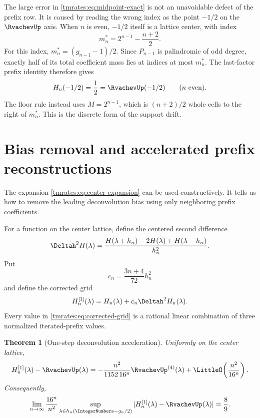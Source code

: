 \documentclass[11pt,oneside]{article}
\newtheorem{theorem}{Theorem}[section]
\theoremstyle{definition}
\theoremstyle{remark}
\begin{document}
The large error in \eqref{tmrates:eq:midpoint-exact} is not an unavoidable defect of the prefix row.
It is caused by reading the wrong index as the point $-1/2$ on the $\RvachevUp$ axis.  When $n$ is
even, $-1/2$ itself is a lattice center, with index
\begin{equation}
 m_n^*=2^{n-1}-\frac{n+2}{2}.                              \label{tmrates:eq:midpoint-correct-index}
\end{equation}
For this index, $m_n^*=(g_{n-1}-1)/2$.  Since $P_{n-1}$ is palindromic of odd degree, exactly
half of its total coefficient mass lies at indices at most $m_n^*$.  The last-factor prefix
identity therefore gives
\begin{equation}
 H_n(-1/2)=\frac12=\RvachevUp(-1/2) \qquad(n\ \text{even}).       \label{tmrates:eq:midpoint-centered-exact}
\end{equation}
The floor rule instead uses $M=2^{n-1}$, which is $(n+2)/2$ whole cells to the right of
$m_n^*$.  This is the discrete form of the support drift.

\section{Bias removal and accelerated prefix reconstructions}
\label{tmrates:sec:acceleration}

The expansion \eqref{tmrates:eq:center-expansion} can be used constructively.  It tells us how to
remove the leading deconvolution bias using only neighboring prefix coefficients.

For a function on the center lattice, define the centered second difference
\begin{equation}
 \Deltah^2H(\lambda)
 =\frac{H(\lambda+h_n)-2H(\lambda)+H(\lambda-h_n)}{h_n^2}. \label{tmrates:eq:discrete-laplacian}
\end{equation}
Put
\begin{equation}
 c_n=\frac{3n+4}{72}h_n^2
\end{equation}
and define the corrected grid
\begin{equation}
 H_n^{[1]}(\lambda)=H_n(\lambda)+c_n\Deltah^2H_n(\lambda). \label{tmrates:eq:corrected-grid}
\end{equation}
Every value in \eqref{tmrates:eq:corrected-grid} is a rational linear combination of three normalized
iterated-prefix values.

\begin{theorem}[One-step deconvolution acceleration]
\label{tmrates:thm:accelerated}
Uniformly on the center lattice,
\begin{equation}
 H_n^{[1]}(\lambda)-\RvachevUp(\lambda)
 =-\frac{n^2}{1152\,16^n}\RvachevUp^{(4)}(\lambda)
  +\LittleO\!\left(\frac{n^2}{16^n}\right).                \label{tmrates:eq:accelerated-profile}
\end{equation}
Consequently,
\begin{equation}
 \lim_{n\to\infty}\frac{16^n}{n^2}
 \sup_{\lambda\in h_n(\IntegerNumbers-g_n/2)}
 |H_n^{[1]}(\lambda)-\RvachevUp(\lambda)|
 =\frac89.                                                 \label{tmrates:eq:accelerated-norm}
\end{equation}
\end{theorem}
\end{document}

